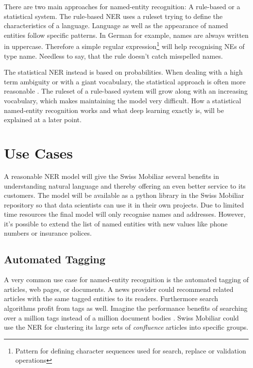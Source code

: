 There are two main approaches for named-entity recognition: A rule-based or a statistical system. The rule-based NER uses a ruleset trying to define the characteristics of a language. Language as well as the appearance of named entities follow specific patterns. In German for example, names are always written in uppercase. Therefore a simple regular expression\footnote{Pattern for defining character sequences used for search, replace or validation operations} will help recognising NEs of type name. Needless to say, that the rule doesn't catch misspelled names.

The statistical NER instead is based on probabilities. When dealing with a high term ambiguity or with a giant vocabulary, the statistical approach is often more reasonable \cite{blub}. The ruleset of a rule-based system will grow along with an increasing vocabulary, which makes maintaining the model very difficult. How a statistical named-entity recognition works and what deep learning exactly is, will be explained at a later point.

\section{Use Cases}

A reasonable NER model will give the Swiss Mobiliar several benefits in understanding natural language and thereby offering an even better service to its customers. The model will be available as a python library in the Swiss Mobiliar repository so that data scientists can use it in their own projects. Due to limited time resources the final model will only recognise names and addresses. However, it's possible to extend the list of named entities with new values like phone numbers or insurance polices.

\subsection{Automated Tagging}

A very common use case for named-entity recognition is the automated tagging of articles, web pages, or documents. A news provider could recommend related articles with the same tagged entities to its readers. Furthermore search algorithms profit from tags as well. Imagine the performance benefits of searching over a million tags instead of a million document bodies \cite{gupta}. Swiss Mobiliar could use the NER for clustering its large sets of \emph{confluence} articles into specific groups.

